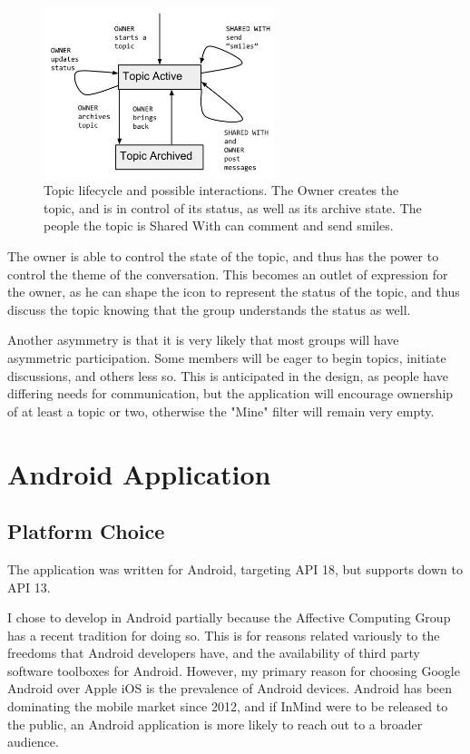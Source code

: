         \begin{figure}
        \centering
        \includegraphics[width=0.6\textwidth]{topic_lifecycle.jpg}
        \caption{Topic lifecycle and possible interactions.
        The Owner creates the topic, and is in control of its status,
        as well as its archive state.
        The people the topic is Shared With can comment and send smiles.}
        \label{fig:topic_lifecycle}
        \end{figure}

      The owner is able to control the state of the topic,
      and thus has the power to control the theme of the conversation.
      This becomes an outlet of expression for the owner,
      as he can shape the icon to represent the status of the topic,
      and thus discuss the topic knowing that the group understands the status as well.

      Another asymmetry is that it is very likely that most groups will
      have asymmetric participation.
      Some members will be eager to begin topics, initiate discussions,
      and others less so.
      This is anticipated in the design,
      as people have differing needs for communication,
      but the application will encourage ownership of at least a topic or two,
      otherwise the "Mine" filter will remain very empty.

  \section{Android Application}

    \subsection{Platform Choice}
    The application was written for Android, targeting API 18,
    but supports down to API 13.

    I chose to develop in Android partially because the Affective Computing Group
    has a recent tradition for doing so.
    This is for reasons related variously to the freedoms that Android developers have,
    and the availability of third party software toolboxes for Android.
    However, my primary reason for choosing Google Android over Apple iOS is
    the prevalence of Android devices.
    Android has been dominating the mobile market since 2012,
    and if InMind were to be released to the public,
    an Android application is more likely to reach out to a broader audience.

